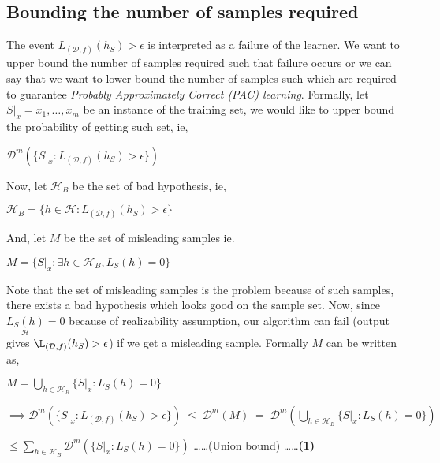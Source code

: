 \documentclass[a4paper]{article}
\begin{document}
            \subsection{Bounding the number of samples required}
            The event $L_{(\mathcal{D},f)}(h_S) > \epsilon$ is interpreted as a failure of the learner. We want to upper bound the number of samples required such that failure occurs or we can say that we want to lower bound the number of samples such which are required to guarantee \textit{Probably Approximately Correct (PAC) learning}. Formally, let $S|_x = {x_1,\dots,x_m}$ be an instance of the training set, we would like to upper bound the probability of getting such set, ie,
            \begin{center}
                $
                \mathcal{D}^{m}(\{S|_x : L_{(\mathcal{D},f)}(h_S) > \epsilon\})
                $
            \end{center}
            
            Now, let $\mathcal{H}_B$ be the set of bad hypothesis, ie,
            \begin{center}
                $\mathcal{H}_B = \{h \in \mathcal{H}: L_{(\mathcal{D},f)}(h_S) > \epsilon\}$
            \end{center}
            And, let $M$ be the set of misleading samples ie.
            \begin{center}
                $
                M = \{S|_x:\exists h \in \mathcal{H}_B, L_S(h) = 0\}
                $
            \end{center}
            
            Note that the set of misleading samples is the problem because of such samples, there exists a bad hypothesis which looks good on the sample set.
            Now, since $\underset{\mathcal{H}}{L_S(h)} = 0$ because of realizability assumption, our algorithm can fail (output gives $\L_{(\mathcal{D},f)}(h_S) > \epsilon$) if we get a misleading sample. Formally $M$ can be written as,
            \begin{center}
                $
                    M = \underset{h\in\mathcal{H}_B}{\bigcup}\{S|_x:L_S(h) = 0\}
                $
                
                $
                    \implies \mathcal{D}^m(\{S|_x: L_{(\mathcal{D},f)}(h_S) >\epsilon\})\; \leq \;\mathcal{D}^m(M)\; =\; \mathcal{D}^m(\underset{h\in\mathcal{H}_B}{\bigcup}\{S|_x:L_S(h) = 0\})
                $
                
                $
                    \leq \displaystyle\sum_{h\in \mathcal{H}_B}\mathcal{D}^m(\{S|_x:L_S(h) = 0\})
                $ \dots\dots (Union bound) \dots\dots \textbf{(1)}
            \end{center}
            
\end{document}
